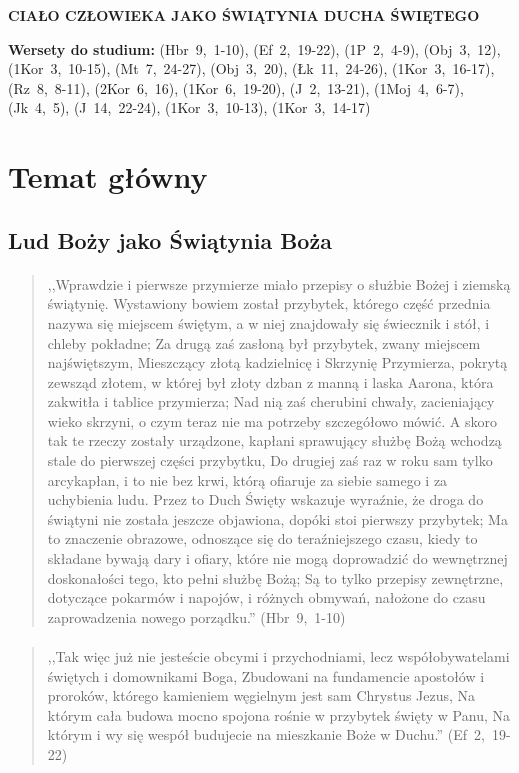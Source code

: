 \documentclass[10pt,a4paper,oneside]{article}
\begin{document}
\centerline{\textbf{\MakeUppercase{Ciało człowieka jako Świątynia Ducha Świętego}}}
\begin{center}
\textbf{Wersety do studium:} 
\mbox{(Hbr 9, 1-10)}, \mbox{(Ef 2, 19-22)}, \mbox{(1P 2, 4-9)}, \mbox{(Obj 3, 12)}, \mbox{(1Kor 3, 10-15)}, \mbox{(Mt 7, 24-27)}, \mbox{(Obj 3, 20)}, \mbox{(Łk 11, 24-26)}, \mbox{(1Kor 3, 16-17)}, \mbox{(Rz 8, 8-11)}, \mbox{(2Kor 6, 16)}, \mbox{(1Kor 6, 19-20)}, \mbox{(J 2, 13-21)}, \mbox{(1Moj 4, 6-7)}, \mbox{(Jk 4, 5)}, \mbox{(J 14, 22-24)}, \mbox{(1Kor 3, 10-13)}, \mbox{(1Kor 3, 14-17)}
\end{center}
\section{Temat główny}
\subsection{Lud Boży jako Świątynia Boża}
\paragraph{}
\begin{quote}
,,Wprawdzie i pierwsze przymierze miało przepisy o służbie Bożej i ziemską świątynię. Wystawiony bowiem został przybytek, którego część przednia nazywa się miejscem świętym, a w niej znajdowały się świecznik i stół, i chleby pokładne; Za drugą zaś zasłoną był przybytek, zwany miejscem najświętszym, Mieszczący złotą kadzielnicę i Skrzynię Przymierza, pokrytą zewsząd złotem, w której był złoty dzban z manną i laska Aarona, która zakwitła i tablice przymierza; Nad nią zaś cherubini chwały, zacieniający wieko skrzyni, o czym teraz nie ma potrzeby szczegółowo mówić. A skoro tak te rzeczy zostały urządzone, kapłani sprawujący służbę Bożą wchodzą stale do pierwszej części przybytku, Do drugiej zaś raz w roku sam tylko arcykapłan, i to nie bez krwi, którą ofiaruje za siebie samego i za uchybienia ludu. Przez to Duch Święty wskazuje wyraźnie, że droga do świątyni nie została jeszcze objawiona, dopóki stoi pierwszy przybytek; Ma to znaczenie obrazowe, odnoszące się do teraźniejszego czasu, kiedy to składane bywają dary i ofiary, które nie mogą doprowadzić do wewnętrznej doskonałości tego, kto pełni służbę Bożą; Są to tylko przepisy zewnętrzne, dotyczące pokarmów i napojów, i różnych obmywań, nałożone do czasu zaprowadzenia nowego porządku.'' \mbox{(Hbr 9, 1-10)}
\end{quote}
\paragraph{}
\begin{quote}
,,Tak więc już nie jesteście obcymi i przychodniami, lecz współobywatelami świętych i domownikami Boga, Zbudowani na fundamencie apostołów i proroków, którego kamieniem węgielnym jest sam Chrystus Jezus, Na którym cała budowa mocno spojona rośnie w przybytek święty w Panu, Na którym i wy się wespół budujecie na mieszkanie Boże w Duchu.'' \mbox{(Ef 2, 19-22)}
\end{quote}
\end{document}
